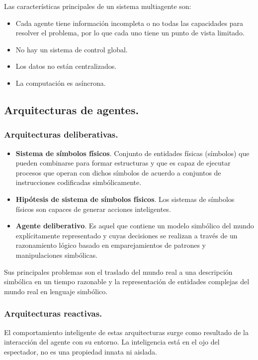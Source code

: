 \documentclass[12pt,spanish]{article}
\numberwithin{definition}{subsection}
\begin{document}
Las características principales de un sistema multiagente son:
\begin{itemize}
	\item Cada agente tiene información incompleta o no todas las capacidades para resolver el problema, por lo que cada uno tiene un punto de vista limitado.
	\item No hay un sistema de control global.
	\item Los datos no están centralizados.
	\item La computación es asíncrona.
\end{itemize}

\subsection{Arquitecturas de agentes.}

\subsubsection{Arquitecturas deliberativas.}

\begin{itemize}
	\item \textbf{Sistema de símbolos físicos}. Conjunto de entidades físicas (símbolos) que pueden combinarse para formar estructuras y que es capaz de ejecutar procesos que operan con dichos símbolos de acuerdo a conjuntos de instrucciones codificadas simbólicamente.
	\item \textbf{Hipótesis de sistema de símbolos físicos}. Los sistemas de símbolos físicos son capaces de generar acciones inteligentes.
	\item \textbf{Agente deliberativo}. Es aquel que contiene un modelo simbólico del mundo explícitamente representado y cuyas decisiones se realizan a través de un razonamiento lógico basado en emparejamientos de patrones y manipulaciones simbólicas.
\end{itemize}

Sus principales problemas son el traslado del mundo real a una descripción simbólica en un tiempo razonable y la representación de entidades complejas del mundo real en lenguaje simbólico.

\subsubsection{Arquitecturas reactivas.}

El comportamiento inteligente de estas arquitecturas surge como resultado de la interacción del agente con su entorno. La inteligencia está en el ojo del espectador, no es una propiedad innata ni aislada.\\
\end{document}
